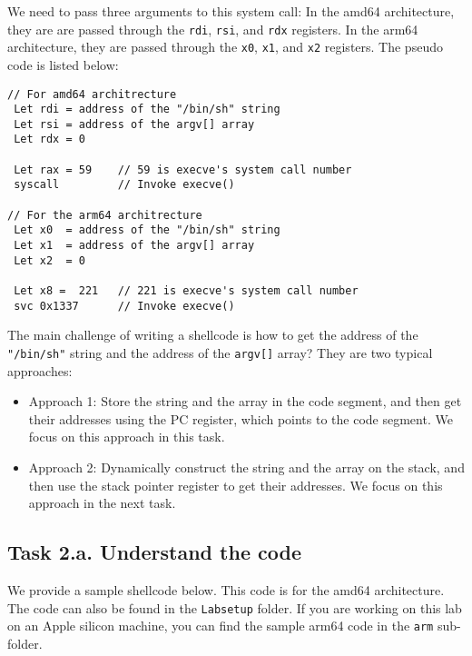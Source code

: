 We need to pass three arguments to this system call:
In the amd64 architecture, they are are 
passed through the \texttt{rdi}, \texttt{rsi},
and \texttt{rdx} registers.  
In the arm64 architecture, they are
passed through the \texttt{x0}, \texttt{x1}, 
and \texttt{x2} registers. 
The pseudo code is listed below: 
 
\begin{lstlisting}
// For amd64 architrecture
 Let rdi = address of the "/bin/sh" string
 Let rsi = address of the argv[] array
 Let rdx = 0

 Let rax = 59    // 59 is execve's system call number
 syscall         // Invoke execve()

// For the arm64 architrecture
 Let x0  = address of the "/bin/sh" string
 Let x1  = address of the argv[] array
 Let x2  = 0

 Let x8 =  221   // 221 is execve's system call number
 svc 0x1337      // Invoke execve()
\end{lstlisting}


The main challenge of writing a shellcode is how to get the address 
of the \texttt{"/bin/sh"} string and the address of 
the \texttt{argv[]} array? They are two typical approaches:


\begin{itemize}
\item Approach 1: Store the string and the array in the code segment, 
  and then get their addresses using the PC register, which points to the
  code segment. We focus on this approach in this task. 

\item Approach 2: Dynamically construct the string and the 
  array on the stack, and then use the stack pointer register 
  to get their addresses. We focus on this approach in the next task.
\end{itemize}
 

\subsection{Task 2.a. Understand the code} 

We provide a sample shellcode below. This code is for the amd64 
architecture. The code can also be found in the \texttt{Labsetup} folder. 
If you are working on this lab on an Apple silicon machine, you can
find the sample arm64 code in the \texttt{arm} sub-folder.

